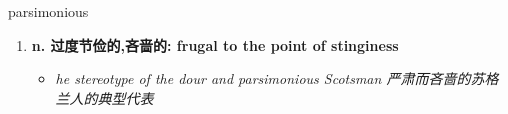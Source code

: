 
\begin{frame}
{\huge parsimonious}
\begin{center}
\begin{enumerate}\Large
  \item \textbf{n. 过度节俭的,吝啬的: frugal to the point of stinginess}
  \begin{itemize}
    \item \em{\Large{he stereotype of the dour and parsimonious Scotsman 严肃而吝啬的苏格兰人的典型代表}}
  \end{itemize}
\end{enumerate}
\end{center}
\end{frame}
